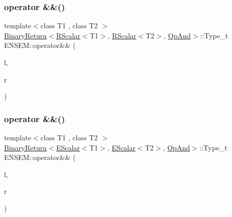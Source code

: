 \mbox{\label{namespaceENSEM_ga142a7a22c88f64f590411925c5c3cdcd}} 
\subsubsection{\texorpdfstring{operator \&\&()}{operator \&\&()}\hspace{0.1cm}{\footnotesize\ttfamily [3/7]}}
{\footnotesize\ttfamily template$<$class T1 , class T2 $>$ \\
\mbox{\hyperlink{structENSEM_1_1BinaryReturn}{Binary\+Return}}$<$\mbox{\hyperlink{classENSEM_1_1RScalar}{R\+Scalar}}$<$T1$>$, \mbox{\hyperlink{classENSEM_1_1RScalar}{R\+Scalar}}$<$T2$>$, \mbox{\hyperlink{structENSEM_1_1OpAnd}{Op\+And}}$>$\+::Type\+\_\+t E\+N\+S\+E\+M\+::operator\&\& (\begin{DoxyParamCaption}\item[{const \mbox{\hyperlink{classENSEM_1_1RScalar}{R\+Scalar}}$<$ T1 $>$ \&}]{l,  }\item[{const \mbox{\hyperlink{classENSEM_1_1RScalar}{R\+Scalar}}$<$ T2 $>$ \&}]{r }\end{DoxyParamCaption})\hspace{0.3cm}{\ttfamily [inline]}}

\mbox{\label{namespaceENSEM_ga8ca8cd66f3b104a6439afa608f4a6e50}} 
\subsubsection{\texorpdfstring{operator \&\&()}{operator \&\&()}\hspace{0.1cm}{\footnotesize\ttfamily [4/7]}}
{\footnotesize\ttfamily template$<$class T1 , class T2 $>$ \\
\mbox{\hyperlink{structENSEM_1_1BinaryReturn}{Binary\+Return}}$<$\mbox{\hyperlink{classENSEM_1_1EScalar}{E\+Scalar}}$<$T1$>$, \mbox{\hyperlink{classENSEM_1_1EScalar}{E\+Scalar}}$<$T2$>$, \mbox{\hyperlink{structENSEM_1_1OpAnd}{Op\+And}}$>$\+::Type\+\_\+t E\+N\+S\+E\+M\+::operator\&\& (\begin{DoxyParamCaption}\item[{const \mbox{\hyperlink{classENSEM_1_1EScalar}{E\+Scalar}}$<$ T1 $>$ \&}]{l,  }\item[{const \mbox{\hyperlink{classENSEM_1_1EScalar}{E\+Scalar}}$<$ T2 $>$ \&}]{r }\end{DoxyParamCaption})\hspace{0.3cm}{\ttfamily [inline]}}

